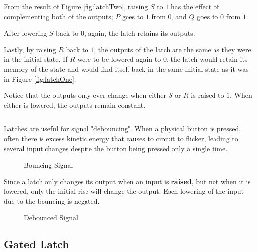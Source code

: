 \documentclass[12pt]{article}
\begin{document}
\begin{figure}[H]
  \centering
  
  \caption{}
  \label{fig:latchThree}
\end{figure}

From the result of Figure \ref{fig:latchTwo}, raising $S$ to $1$ has the effect of
complementing both of the outputs; $P$ goes to $1$ from $0$, and $Q$ goes to $0$ from $1$.

\begin{figure}[H]
  \centering
  
  \caption{}
  \label{fig:latchFour}
\end{figure}

After lowering $S$ back to $0$, again, the latch retains its outputs.

\begin{figure}[H]
  \centering
  
  \caption{}
  \label{fig:latchFive}
\end{figure}

Lastly, by raising $R$ back to $1$, the outputs of the latch are the same as they were in
the initial state. If $R$ were to be lowered again to $0$, the latch would retain its
memory of the state and would find itself back in the same initial state as it was in 
Figure \ref{fig:latchOne}.

Notice that the outputs only ever change when either $S$ or $R$ is raised to $1$. When
either is lowered, the outputs remain constant.
\vspace{12pt}
\hrule

Latches are useful for signal "debouncing". When a physical button is pressed, often there
is excess kinetic energy that causes to circuit to flicker, leading to several input
changes despite the button being pressed only a single time.
\begin{figure}[H]
  \centering
  
  \caption{Bouncing Signal}
  \label{fig:025}
  \vspace{-15pt}
\end{figure}
Since a latch only changes its output when an input is \textbf{raised}, but not when it
is lowered, only the initial rise will change the output. Each lowering of the input due
to the bouncing is negated.
\begin{figure}[H]
  \centering
  
  \caption{Debounced Signal}
  \label{fig:026}
\end{figure}

\subsection{Gated Latch}
\label{ssec:gatedLatch}
\end{document}
